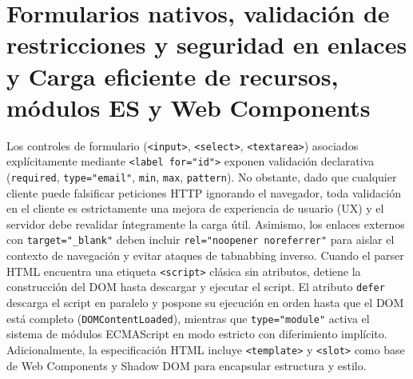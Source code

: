 \documentclass{book}
\begin{document}
\section{Formularios nativos, validación de restricciones y seguridad en enlaces y Carga eficiente de recursos, módulos ES y Web Components}

Los controles de formulario (\texttt{<input>}, \texttt{<select>}, \texttt{<textarea>}) asociados explícitamente mediante \texttt{<label for="id">} exponen validación declarativa (\texttt{required}, \texttt{type="email"}, \texttt{min}, \texttt{max}, \texttt{pattern}). No obstante, dado que cualquier cliente puede falsificar peticiones HTTP ignorando el navegador, toda validación en el cliente es estrictamente una mejora de experiencia de usuario (UX) y el servidor debe revalidar íntegramente la carga útil. Asimismo, los enlaces externos con \texttt{target="\_blank"} deben incluir \texttt{rel="noopener noreferrer"} para aislar el contexto de navegación y evitar ataques de tabnabbing inverso.
Cuando el parser HTML encuentra una etiqueta \texttt{<script>} clásica sin atributos, detiene la construcción del DOM hasta descargar y ejecutar el script. El atributo \texttt{defer} descarga el script en paralelo y pospone su ejecución en orden hasta que el DOM está completo (\texttt{DOMContentLoaded}), mientras que \texttt{type="module"} activa el sistema de módulos ECMAScript en modo estricto con diferimiento implícito. Adicionalmente, la especificación HTML incluye \texttt{<template>} y \texttt{<slot>} como base de Web Components y Shadow DOM para encapsular estructura y estilo.
\end{document}
